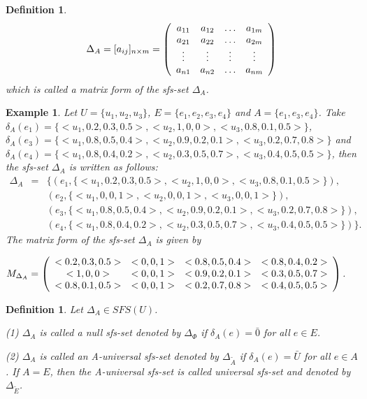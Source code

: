 \documentclass{IJFS}
\newtheorem{definition}[theorem]{Definition}
\newtheorem{ex}[theorem]{Example}
\begin{document}
\begin{definition}
\begin{equation}\label{m}
\Delta_A=[a_{ij}]_{n\times m}=\left(
\begin{array}{c c c c}
a_{11}&a_{12}&\ldots&a_{1m}  \\
a_{21}&a_{22}&\ldots&a_{2m} \\
\vdots&\vdots&\vdots&\vdots \\
a_{n1}&a_{n2}&\ldots&a_{nm}
\end{array} \right)
\end{equation}
which is called a  matrix form of the sfs-set $\Delta_A$.
\end{definition}

\begin{ex} Let $U=\{u_1, u_2, u_3\}$,  $E=\{e_1, e_2, e_3,
e_4\}$ and $A=\{e_1, e_3, e_4\}$. Take $\delta_A(e_1)=\{<u_1, 0.2,
0.3, 0.5>, <u_2, 1, 0, 0>, <u_3, 0.8, 0.1, 0.5>\}$,
$\delta_A(e_3)=\{<u_1, 0.8, 0.5, 0.4>, <u_2, 0.9, 0.2, 0.1>, <u_3,
0.2, 0.7, 0.8>\}$ and \linebreak[4] $\delta_A(e_4)=\{<u_1, 0.8, 0.4, 0.2>, <u_2,
0.3, 0.5, 0.7>, <u_3, 0.4, 0.5, 0.5>\}$, then the sfs-set
$\Delta_A$ is written as follows:
\begin{eqnarray*}
\Delta_A&=&\{(e_1, \{<u_1, 0.2, 0.3, 0.5>, <u_2, 1, 0, 0>, <u_3,
0.8, 0.1, 0.5>\}), \\
&&(e_2, \{<u_1,0, 0, 1>, <u_2, 0, 0, 1>, <u_3, 0, 0, 1>\}),\\&&
(e_3,\{<u_1, 0.8, 0.5, 0.4>, <u_2, 0.9, 0.2, 0.1>, <u_3, 0.2, 0.7,
0.8>\}),\\ &&(e_4, \{<u_1, 0.8, 0.4, 0.2>, <u_2, 0.3, 0.5, 0.7>,
<u_3, 0.4, 0.5, 0.5>\})\}.
\end{eqnarray*}
The matrix form of the sfs-set $\Delta_A$ is given by
\begin{center}
$M_{\Delta_A}=\left(
\begin{array}{c c c c}
<0.2, 0.3, 0.5> &<0, 0, 1> &<0.8, 0.5,
0.4>&<0.8, 0.4, 0.2>  \\
<1, 0, 0>& <0, 0, 1>&<0.9, 0.2, 0.1>&<0.3, 0.5, 0.7> \\
<0.8, 0.1, 0.5>&<0, 0, 1>&<0.2, 0.7, 0.8>&<0.4, 0.5, 0.5>
\end{array} \right)$.
\end{center}
\end{ex}



\begin{definition} Let $\Delta_A\in SFS(U)$.

(1) $\Delta_A$ is called a null sfs-set denoted by $\Delta_\Phi$
if $\delta_A(e)=\bar{0}$ for all $e\in E$.

(2) $\Delta_A$ is called an A-universal sfs-set denoted by
$\Delta_{\widetilde{A}}$ if $\delta_A(e)=\bar{U}$ for all $e\in
A$. If $A=E$, then  the A-universal sfs-set is called universal
sfs-set and denoted by $\Delta_{\widetilde{E}}$.
\end{definition}
\end{document}
